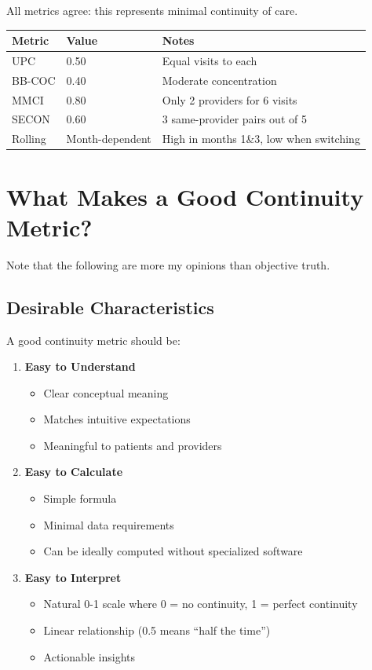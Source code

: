 \documentclass[11pt,a4paper]{article}
\begin{document}
All metrics agree: this represents minimal continuity of care.

\begin{table}[h]
\centering
\begin{tabular}{lll}
\toprule
Metric & Value & Notes \\
\midrule
UPC & 0.50 & Equal visits to each \\
BB-COC & 0.40 & Moderate concentration \\
MMCI & 0.80 & Only 2 providers for 6 visits \\
SECON & 0.60 & 3 same-provider pairs out of 5 \\
Rolling & Month-dependent & High in months 1\&3, low when switching \\
\bottomrule
\end{tabular}
\end{table}

\section{What Makes a Good Continuity Metric?}

Note that the following are more my opinions than objective truth.

\subsection{Desirable Characteristics}

A good continuity metric should be:

\begin{enumerate}
\item \textbf{Easy to Understand}
\begin{itemize}
\item Clear conceptual meaning
\item Matches intuitive expectations
\item Meaningful to patients and providers
\end{itemize}

\item \textbf{Easy to Calculate}
\begin{itemize}
\item Simple formula
\item Minimal data requirements
\item Can be ideally computed without specialized software
\end{itemize}

\item \textbf{Easy to Interpret}
\begin{itemize}
\item Natural 0-1 scale where 0 = no continuity, 1 = perfect continuity
\item Linear relationship (0.5 means ``half the time'')
\item Actionable insights
\end{itemize}
\end{enumerate}
\end{document}
